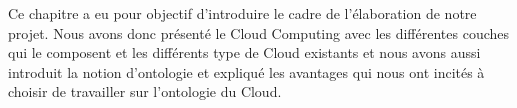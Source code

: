                 Ce chapitre a eu pour objectif d’introduire le cadre de l’élaboration de notre projet.
                Nous avons donc présenté le Cloud Computing avec les différentes couches qui le composent et les différents type de Cloud existants et nous avons aussi introduit la notion d’ontologie et expliqué les avantages qui nous ont incités  à choisir de travailler sur l’ontologie du Cloud.
























